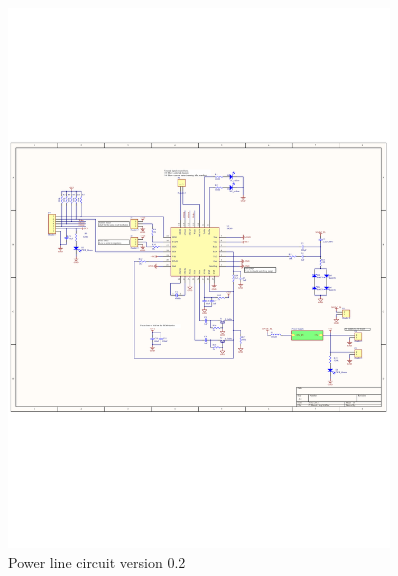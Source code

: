\begin{figure}[H]
	\begin{centering}
		 \includegraphics[width=0.9\textwidth,page=1,angle=0]{content/appendix/eudp/images/SIG60_v0_2}
		\caption{Power line circuit version 0.2}
	\end{centering}
\end{figure}


